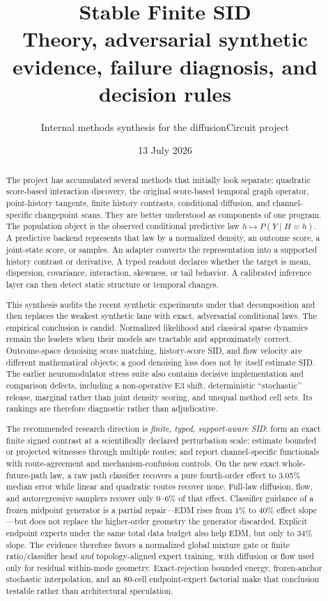 \documentclass[10pt]{article}
\title{\vspace{-1.2cm}\textbf{Stable Finite SID}\\[3pt]
\large Theory, adversarial synthetic evidence, failure diagnosis, and decision rules}
\author{Internal methods synthesis for the diffusionCircuit project}
\date{13 July 2026}
\begin{document}
\maketitle

\begin{abstract}
The project has accumulated several methods that initially look separate: quadratic score-based interaction discovery, the original score-based temporal graph operator, point-history tangents, finite history contrasts, conditional diffusion, and channel-specific changepoint scans. They are better understood as components of one program. The population object is the observed conditional predictive law \(h\mapsto P(Y\mid H=h)\). A predictive backend represents that law by a normalized density, an outcome score, a joint-state score, or samples. An adapter converts the representation into a supported history contrast or derivative. A typed readout declares whether the target is mean, dispersion, covariance, interaction, skewness, or tail behavior. A calibrated inference layer can then detect static structure or temporal changes.

This synthesis audits the recent synthetic experiments under that decomposition and then replaces the weakest synthetic lane with exact, adversarial conditional laws. The empirical conclusion is candid. Normalized likelihood and classical sparse dynamics remain the leaders when their models are tractable and approximately correct. Outcome-space denoising score matching, history-score SID, and flow velocity are different mathematical objects; a good denoising loss does not by itself estimate SID. The earlier neuromodulator stress suite also contains decisive implementation and comparison defects, including a non-operative E3 shift, deterministic ``stochastic'' release, marginal rather than joint density scoring, and unequal method cell sets. Its rankings are therefore diagnostic rather than adjudicative.

The recommended research direction is \emph{finite, typed, support-aware SID}: form an exact finite signed contrast at a scientifically declared perturbation scale; estimate bounded or projected witnesses through multiple routes; and report channel-specific functionals with route-agreement and mechanism-confusion controls.  On the new exact whole-future-path law, a raw path classifier recovers a pure fourth-order effect to 3.05\% median error while linear and quadratic routes recover none.  Full-law diffusion, flow, and autoregressive samplers recover only 0--6\% of that effect.  Classifier guidance of a frozen midpoint generator is a partial repair---EDM rises from 1\% to 40\% effect slope---but does not replace the higher-order geometry the generator discarded.  Explicit endpoint experts under the same total data budget also help EDM, but only to 34\% slope.  The evidence therefore favors a normalized global mixture gate or finite ratio/classifier head \emph{and} topology-aligned expert training, with diffusion or flow used only for residual within-mode geometry.  Exact-rejection bounded energy, frozen-anchor stochastic interpolation, and an 80-cell endpoint-expert factorial make that conclusion testable rather than architectural speculation.
\end{abstract}
\end{document}
